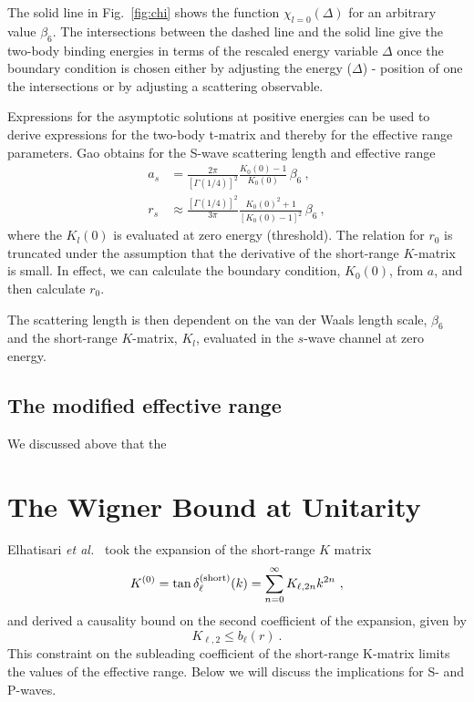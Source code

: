 \documentclass[aps,preprint,superscriptaddress]{revtex4-1}
\begin{document}
The solid line in Fig.~\ref{fig:chi} shows the function
$\chi_{l=0}(\Delta)$ for an arbitrary value $\beta_6$. The
intersections between the dashed line and the solid line give the
two-body binding energies in terms of the rescaled energy variable
$\Delta$ once the boundary condition is chosen either by adjusting the
energy ($\Delta$) - position of one the intersections or by adjusting
a scattering observable.



Expressions for the asymptotic solutions at positive energies can be
used to derive expressions for the two-body t-matrix and thereby for
the effective range parameters. Gao obtains for the S-wave scattering
length and effective range~\cite{PhysRevA.58.4222}
\begin{equation}
  \begin{split}
    \label{eq:gao_a_and_r}
      a_s & = \frac{2\pi}{{[\Gamma(1/4)]}^2}\frac{K_0(0) -
        1}{K_0(0)}\, \beta_6~, \\
      r_s & \approx \frac{{[\Gamma(1/4)]}^2}{3\pi} \frac{K_0{(0)}^2 +
        1}{{[K_0(0)-1]}^2}\, \beta_6~,
  \end{split}
\end{equation}
where the $K_l(0)$ is evaluated at zero energy (threshold).  The
relation for $r_0$ is truncated under the assumption that the
derivative of the short-range $K$-matrix is small.  In effect, we can
calculate the boundary condition, $K_0(0)$, from $a$, and then
calculate $r_0$.

The scattering length is then dependent on the van der Waals length scale,
$\beta_6$ and the short-range $K$-matrix, $K_{l}$, evaluated in the $s$-wave
channel at zero energy.
\subsection{The modified effective range}
We discussed above that the 
\section{The Wigner Bound at Unitarity}
\label{sec:wigner-bound-at-unitarity}
Elhatisari {\it et al.}~\cite{Elhatisari:2013swa} took the expansion
of the short-range $K$ matrix
\begin{equation}
  \label{eq:K_expansion}
  K^{(0)} = \tan\delta_{\ell}^{({\rm short})}(k) = \sum_{n=0}^\infty
  K_{\ell,2n}k^{2n}~,
\end{equation}
and derived a causality bound on the second coefficient of the expansion, given
by
\begin{equation}
  K_{\ell,2} \le b_{\ell}(r)~.
\end{equation}
This constraint on the subleading coefficient of the short-range
K-matrix limits the values of the effective range. Below we will
discuss the implications for S- and P-waves.
\end{document}
